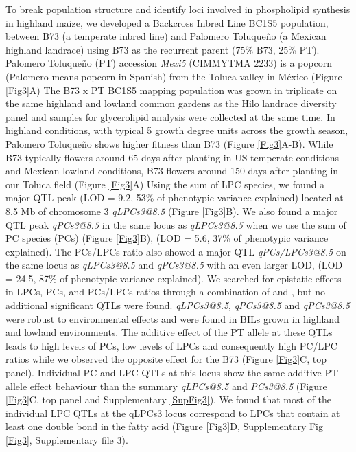 \documentclass[9pt,twocolumn,twoside,lineno]{BioRxiv}
\begin{document}
To break population structure and identify loci involved in phospholipid synthesis in highland maize, we developed a Backcross Inbred  Line BC1S5 population, between B73 (a temperate inbred line) and Palomero Toluqueño (a Mexican highland landrace) using B73 as the recurrent parent (75\% B73, 25\% PT). 
Palomero Toluqueño (PT) accession \textit{Mexi5} (CIMMYTMA 2233) is a popcorn (Palomero means popcorn in Spanish) from the Toluca valley in México (Figure \ref{Fig3}A) 
The B73 x PT BC1S5 mapping population was grown in triplicate on the same highland and lowland common gardens as the Hilo landrace diversity panel and samples for glycerolipid analysis were collected at the same time. 
In highland conditions, with typical 5 growth degree units across the growth season, Palomero Toluqueño shows higher fitness than B73 (Figure \ref{Fig3}A-B).
While B73 typically flowers around 65 days after planting in US temperate conditions and Mexican lowland conditions, B73 flowers around 150 days after planting in our Toluca field (Figure \ref{Fig3}A)
Using the sum of LPC species, we found a major QTL peak (LOD = 9.2, 53\% of phenotypic variance explained) located at 8.5 Mb of chromosome 3 \textit{qLPCs3@8.5} (Figure \ref{Fig3}B).
We also found a major QTL peak \textit{qPCs3@8.5} in the same locus as  \textit{qLPCs3@8.5} when we use the sum of PC species (PCs) (Figure \ref{Fig3}B), (LOD = 5.6, 37\% of phenotypic variance explained). 
The PCs/LPCs ratio also showed a major QTL \textit{qPCs/LPCs3@8.5} on the same locus as  \textit{qLPCs3@8.5} and \textit{qPCs3@8.5} with an even larger LOD, (LOD = 24.5, 87\% of phenotypic variance explained). 
We searched for epistatic effects in LPCs, PCs, and PCs/LPCs ratios through a combination of  and , but no additional significant QTLs were found.
\textit{qLPCs3@8.5}, \textit{qPCs3@8.5} and \textit{qPCs3@8.5}  were robust to environmental effects and were found in BILs grown in highland and lowland environments.
The additive effect of the PT allele at these QTLs leads to high levels of PCs, low levels of LPCs and consequently high PC/LPC ratios while we observed the opposite effect for the B73 (Figure \ref{Fig3}C, top panel).
Individual PC and LPC QTLs at this locus show the same additive PT allele effect behaviour than the summary \textit{qLPCs@8.5} and \textit{PCs3@8.5} (Figure \ref{Fig3}C, top panel and Supplementary \ref{SupFig3}).
We found that most of the individual LPC QTLs at the qLPCs3 locus correspond to LPCs that contain at least one double bond in the fatty acid (Figure  \ref{Fig3}D, Supplementary Fig \ref{Fig3}, Supplementary file 3).
\end{document}
